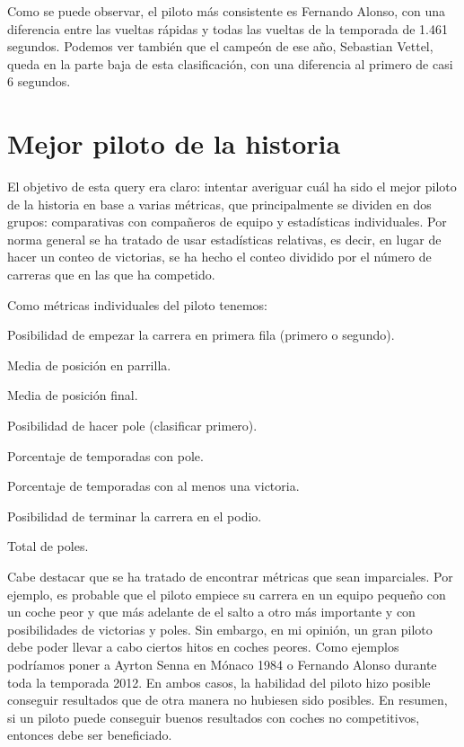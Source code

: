 \documentclass[12pt,twoside,titlepage]{report}
\begin{document}
Como se puede observar, el piloto más consistente es Fernando Alonso, con una diferencia entre las vueltas rápidas y todas las vueltas de la temporada de 1.461 segundos. Podemos ver también que el campeón de ese año, Sebastian Vettel, queda en la parte baja de esta clasificación, con una diferencia al primero de casi 6 segundos.

\section{Mejor piloto de la historia}

El objetivo de esta query era claro: intentar averiguar cuál ha sido el mejor piloto de la historia en base a varias métricas, que principalmente se dividen en dos grupos: comparativas con compañeros de equipo y estadísticas individuales. Por norma general se ha tratado de usar estadísticas relativas, es decir, en lugar de hacer un conteo de victorias, se ha hecho el conteo dividido por el número de carreras que en las que ha competido.

Como métricas individuales del piloto tenemos:
\begin{compactitem}
	\item Posibilidad de empezar la carrera en primera fila (primero o segundo).
	\item Media de posición en parrilla.
	\item Media de posición final.
	\item Posibilidad de hacer pole (clasificar primero).
	\item Porcentaje de temporadas con pole.
	\item Porcentaje de temporadas con al menos una victoria.
	\item Posibilidad de terminar la carrera en el podio.
	\item Total de poles.
\end{compactitem}

Cabe destacar que se ha tratado de encontrar métricas que sean imparciales. Por ejemplo, es probable que el piloto empiece su carrera en un equipo pequeño con un coche peor y que más adelante de el salto a otro más importante y con posibilidades de victorias y poles. Sin embargo, en mi opinión, un gran piloto debe poder llevar a cabo ciertos hitos en coches peores. Como ejemplos podríamos poner a Ayrton Senna en Mónaco 1984 o Fernando Alonso durante toda la temporada 2012. En ambos casos, la habilidad del piloto hizo posible conseguir resultados que de otra manera no hubiesen sido posibles. En resumen, si un piloto puede conseguir buenos resultados con coches no competitivos, entonces debe ser beneficiado.
\end{document}
